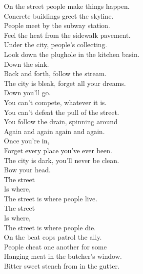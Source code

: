 



On the street people make things happen. \\
Concrete buildings greet the skyline. \\
People meet by the subway station. \\
Feel the heat from the sidewalk pavement. \\

Under the city, people's  collecting. \\
Look down the plughole in the kitchen basin. \\

Down the sink. \\
Back and forth, follow the stream. \\
The city is bleak, forget all your dreams. \\
Down you'll go. \\

You can't compete, whatever it is. \\
You can't defeat the pull of the street. \\
You follow the drain, spinning around \\
Again and again again and again. \\

Once you're in, \\
Forget every place you've ever been. \\
The city is dark, you'll never be clean. \\
Bow your head. \\

The street \\
Is where, \\
The street is where people live. \\
The street \\
Is where, \\
The street is where people die. \\

On the beat cops patrol the ally. \\
People cheat one another for some \\
Hanging meat in the butcher's window. \\
Bitter sweet stench from in the gutter. \\

